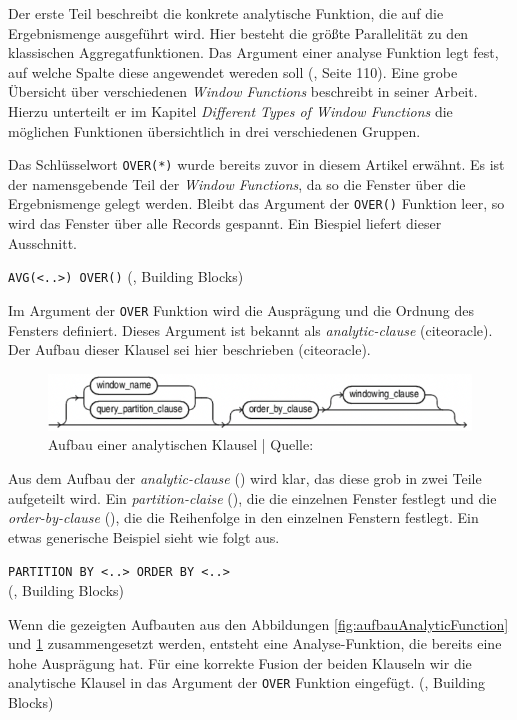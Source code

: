 Der erste Teil beschreibt die konkrete analytische Funktion, die auf die Ergebnismenge
ausgeführt wird. Hier besteht die größte Parallelität zu den klassischen
Aggregatfunktionen. Das Argument einer analyse Funktion legt fest, auf welche
Spalte diese angewendet wereden soll (\cite{schicker2017datenbanken}, Seite 110).
Eine grobe Übersicht über verschiedenen \textit{Window Functions} beschreibt \cite{ibrahaim23}
in seiner Arbeit. Hierzu unterteilt er im Kapitel \textit{Different Types of
Window Functions} die möglichen Funktionen übersichtlich in drei verschiedenen Gruppen.

Das Schlüsselwort \texttt{OVER(*)} wurde bereits zuvor in diesem Artikel erwähnt.
Es ist der namensgebende Teil der \textit{Window Functions}, da so die Fenster über
die Ergebnismenge gelegt werden. Bleibt das Argument der \texttt{OVER()} Funktion
leer, so wird das Fenster über alle Records gespannt. Ein Biespiel liefert dieser
Ausschnitt.

\texttt{AVG(<..>) OVER()} (\cite{Nuijten2023}, Building Blocks)

Im Argument der \texttt{OVER} Funktion wird die Ausprägung und die Ordnung des Fensters
definiert. Dieses Argument ist bekannt als \textit{analytic-clause} (cite{oracle}).
Der Aufbau dieser Klausel sei hier beschrieben (cite{oracle}).

\begin{figure}[h]
	\centering
	\includegraphics[scale=0.5]{img/aufbauAnalyticClausel.jpg}
	\caption{ Aufbau einer analytischen Klausel | Quelle: \cite{oracle}}
	\label{fig:aufbauAnalytischeKlausel}
\end{figure}

Aus dem Aufbau der \textit{analytic-clause} (\cite{oracle}) wird klar, das diese
grob in zwei Teile aufgeteilt wird. Ein \textit{partition-claise} (\cite{oracle}),
die die einzelnen Fenster festlegt und die \textit{order-by-clause} (\cite{oracle}),
die die Reihenfolge in den einzelnen Fenstern festlegt. Ein etwas generische Beispiel
sieht wie folgt aus.

\texttt{PARTITION BY <..> ORDER BY <..>} \\ (\cite{Nuijten2023}, Building Blocks)

Wenn die gezeigten Aufbauten aus den Abbildungen
\ref{fig:aufbauAnalyticFunction} und \ref{fig:aufbauAnalytischeKlausel}
zusammengesetzt werden, entsteht eine Analyse-Funktion, die bereits eine hohe
Ausprägung hat. Für eine korrekte Fusion der beiden Klauseln wir die analytische
Klausel in das Argument der \texttt{OVER} Funktion eingefügt. (\cite{Nuijten2023},
Building Blocks)

